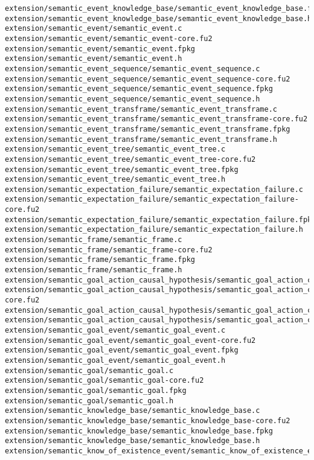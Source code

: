 \begin{lstlisting}
extension/semantic_event_knowledge_base/semantic_event_knowledge_base.fpkg
extension/semantic_event_knowledge_base/semantic_event_knowledge_base.h
extension/semantic_event/semantic_event.c
extension/semantic_event/semantic_event-core.fu2
extension/semantic_event/semantic_event.fpkg
extension/semantic_event/semantic_event.h
extension/semantic_event_sequence/semantic_event_sequence.c
extension/semantic_event_sequence/semantic_event_sequence-core.fu2
extension/semantic_event_sequence/semantic_event_sequence.fpkg
extension/semantic_event_sequence/semantic_event_sequence.h
extension/semantic_event_transframe/semantic_event_transframe.c
extension/semantic_event_transframe/semantic_event_transframe-core.fu2
extension/semantic_event_transframe/semantic_event_transframe.fpkg
extension/semantic_event_transframe/semantic_event_transframe.h
extension/semantic_event_tree/semantic_event_tree.c
extension/semantic_event_tree/semantic_event_tree-core.fu2
extension/semantic_event_tree/semantic_event_tree.fpkg
extension/semantic_event_tree/semantic_event_tree.h
extension/semantic_expectation_failure/semantic_expectation_failure.c
extension/semantic_expectation_failure/semantic_expectation_failure-core.fu2
extension/semantic_expectation_failure/semantic_expectation_failure.fpkg
extension/semantic_expectation_failure/semantic_expectation_failure.h
extension/semantic_frame/semantic_frame.c
extension/semantic_frame/semantic_frame-core.fu2
extension/semantic_frame/semantic_frame.fpkg
extension/semantic_frame/semantic_frame.h
extension/semantic_goal_action_causal_hypothesis/semantic_goal_action_causal_hypothesis.c
extension/semantic_goal_action_causal_hypothesis/semantic_goal_action_causal_hypothesis-core.fu2
extension/semantic_goal_action_causal_hypothesis/semantic_goal_action_causal_hypothesis.fpkg
extension/semantic_goal_action_causal_hypothesis/semantic_goal_action_causal_hypothesis.h
extension/semantic_goal_event/semantic_goal_event.c
extension/semantic_goal_event/semantic_goal_event-core.fu2
extension/semantic_goal_event/semantic_goal_event.fpkg
extension/semantic_goal_event/semantic_goal_event.h
extension/semantic_goal/semantic_goal.c
extension/semantic_goal/semantic_goal-core.fu2
extension/semantic_goal/semantic_goal.fpkg
extension/semantic_goal/semantic_goal.h
extension/semantic_knowledge_base/semantic_knowledge_base.c
extension/semantic_knowledge_base/semantic_knowledge_base-core.fu2
extension/semantic_knowledge_base/semantic_knowledge_base.fpkg
extension/semantic_knowledge_base/semantic_knowledge_base.h
extension/semantic_know_of_existence_event/semantic_know_of_existence_event.c

\end{lstlisting}

